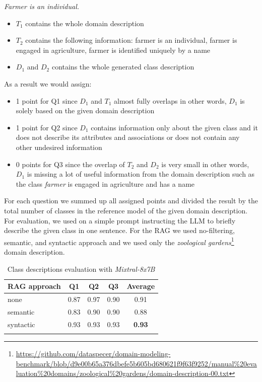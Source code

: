 \noindent{}\textit{Farmer is an individual.}

\begin{itemize}
\item $T_1$ contains the whole domain description
\item $T_2$ contains the following information: farmer is an individual, farmer is engaged in agriculture, farmer is identified uniquely by a name
\item $D_1$ and $D_2$ contains the whole generated class description
\end{itemize}

\noindent{}As a result we would assign:

\begin{itemize}
\item 1 point for Q1 since $D_1$ and $T_1$ almost fully overlaps in other words, $D_1$ is solely based on the given domain description
\item 1 point for Q2 since $D_1$ contains information only about the given class and it does not describe its attributes and associations or does not contain any other undesired information
\item 0 points for Q3 since the overlap of $T_2$ and $D_2$ is very small in other words, $D_1$ is missing a lot of useful information from the domain description such as the class \textit{farmer} is engaged in agriculture and has a name
\end{itemize}

For each question we summed up all assigned points and divided the result by the total number of classes in the reference model of the given domain description. For evaluation, we used on a simple prompt instructing the LLM to briefly describe the given class in one sentence. For the RAG we used no-filtering, semantic, and syntactic approach and we used only the \emph{zoological gardens}\footnote{\url{https://github.com/dataspecer/domain-modeling-benchmark/blob/d9e00b65a376dbefe5b605bd680621f9f63f9252/manual\%20evaluation\%20domains/zoological\%20gardens/domain-description-00.txt}} domain description.

\begin{table}[!h]
    \scriptsize
    \centering
    \setlength{\tabcolsep}{0.5em}
    \begin{tabular}{lcccc}
     \toprule
        RAG approach & Q1 & Q2 & Q3 & Average \\
    \toprule
    
    \addlinespace
         none       & 0.87 & 0.97 & 0.90 & 0.91 \\
    	 semantic   & 0.83 & 0.90 & 0.90 & 0.88 \\
         syntactic  & 0.93 & 0.93 & 0.93 & \textbf{0.93} \\
    \addlinespace
    \bottomrule
    \addlinespace
    \end{tabular}
    \caption{Class descriptions evaluation with \emph{Mixtral-8x7B}}
    \label{tab:mixtral-classes-descriptions}
\end{table}

